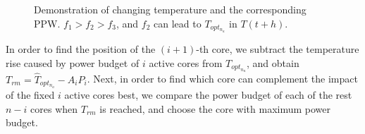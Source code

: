\begin{figure}[htb]
{\begin{minipage}{.45\linewidth}
\end{minipage}
}
\caption{Demonstration of changing temperature and the corresponding PPW. $f_{1}>f_{2}>f_{3}$, and $f_{2}$ can lead to $T_{opt_{n_{a}}}$ in $T(t+h)$.}
\label{fig:ppw_boost}
\end{figure}

In order to find the position of the $(i+1)$-th core, we subtract the temperature rise caused by power budget of $i$ active cores from $T_{opt_{n_{a}}}$, and obtain $T_{rm}=\hat{T}_{opt_{n_{a}}}-A_iP_i$. Next, in order to find which core can complement the impact of the fixed $i$ active cores best, we compare the power budget of each of the rest $n-i$ cores when $T_{rm}$ is reached, and choose the core with maximum power budget.






